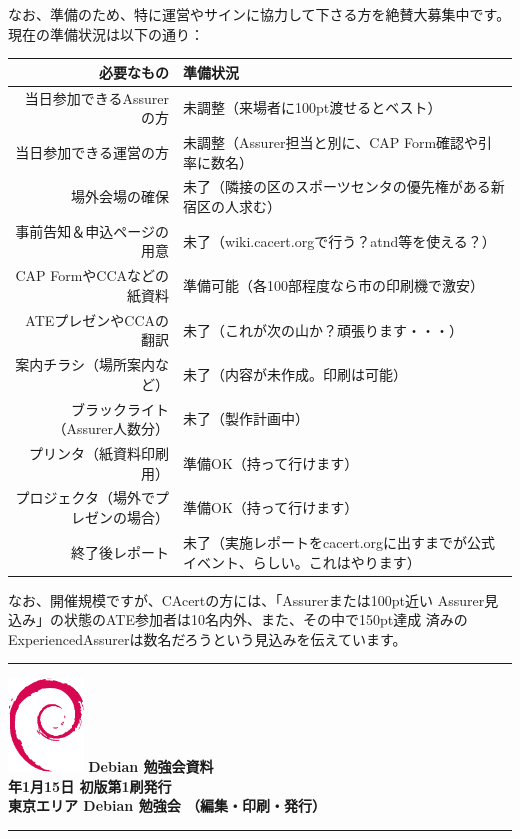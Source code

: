 \documentclass[mingoth,a4paper]{jsarticle}
\newcommand{\debmtgyear}{2011}
\newcommand{\debmtgmonth}{1}
\newcommand{\debmtgdate}{15}
\begin{document}
なお、準備のため、特に運営やサインに協力して下さる方を絶賛大募集中です。
現在の準備状況は以下の通り：
\begin{table}[h]
\begin{center}
\begin{tabular}{|r|p{30em}|}
\hline
必要なもの & 準備状況
\\ \hline
当日参加できるAssurerの方 & 未調整（来場者に100pt渡せるとベスト）
\\ \hline
当日参加できる運営の方 & 未調整（Assurer担当と別に、CAP Form確認や引率に数名）
\\ \hline
場外会場の確保 & 未了（隣接の区のスポーツセンタの優先権がある新宿区の人求む）
\\ \hline
事前告知＆申込ページの用意 & 未了（wiki.cacert.orgで行う？atnd等を使える？）
\\ \hline
CAP FormやCCAなどの紙資料 & 準備可能（各100部程度なら市の印刷機で激安）
\\ \hline
ATEプレゼンやCCAの翻訳 & 未了（これが次の山か？頑張ります・・・）
\\ \hline
案内チラシ（場所案内など） & 未了（内容が未作成。印刷は可能）
\\ \hline
ブラックライト（Assurer人数分）& 未了（製作計画中）
\\ \hline
プリンタ（紙資料印刷用） & 準備OK（持って行けます）
\\ \hline
プロジェクタ（場外でプレゼンの場合） & 準備OK（持って行けます）
\\ \hline
終了後レポート & 未了（実施レポートをcacert.orgに出すまでが公式イベント、らしい。これはやります）
\\ \hline
\end{tabular}
\end{center}
\end{table}

なお、開催規模ですが、CAcertの方には、「Assurerまたは100pt近い
Assurer見込み」の状態のATE参加者は10名内外、また、その中で150pt達成
済みのExperiencedAssurerは数名だろうという見込みを伝えています。


\cleartooddpage

\vspace*{15cm}
\hrule
\vspace{2mm}
\includegraphics[width=2cm]{image200502/openlogo-nd.eps}
\noindent \Large \bf Debian 勉強会資料\\
\noindent \normalfont \debmtgyear{}年\debmtgmonth{}月\debmtgdate{}日 \hspace{5mm}  初版第1刷発行\\
\noindent \normalfont 東京エリア Debian 勉強会 （編集・印刷・発行）\\
\hrule
\end{document}

